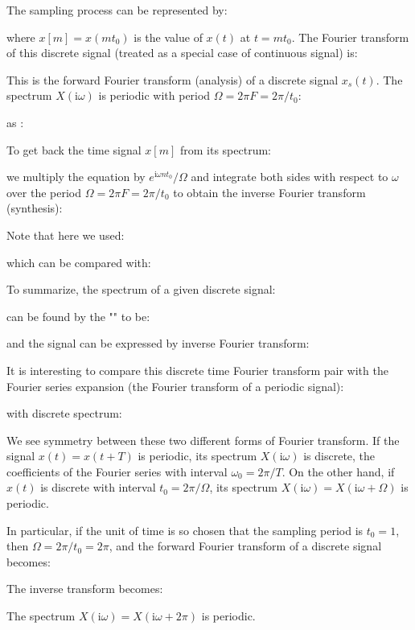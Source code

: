 	The sampling process can be represented by:
	
	where $x[m]=x(mt_0)$ is the value of $x(t)$ at $t=mt_0$. The Fourier transform of this discrete signal (treated as a special case of continuous signal) is:
	
	This is the forward Fourier transform (analysis) of a discrete signal $x_s(t)$. The spectrum $X(\mathrm{i}\omega)$ is periodic with period $\Omega=2\pi F=2\pi/t_0$:
	
	as :
	
	
	To get back the time signal $x[m]$ from its spectrum:
	
	we multiply the equation by $e^{\mathrm{i}\omega nt_0}/\Omega$ and integrate both sides with respect to $\omega$ over the period $\Omega=2\pi F=2\pi/t_0$	to obtain the inverse Fourier transform (synthesis):
	
	Note that here we used:
	
	which can be compared with:
	
	To summarize, the spectrum of a given discrete signal:
	
	can be found by the "" to be:
	
	and the signal can be expressed by inverse Fourier transform:
	
	It is interesting to compare this discrete time Fourier transform pair with the Fourier series expansion (the Fourier transform of a periodic signal): 
	
	
	with discrete spectrum:
	
	We see symmetry between these two different forms of Fourier transform. If the signal $x(t)=x(t+T)$ is periodic, its spectrum $X(\mathrm{i}\omega)$ is discrete, the coefficients of the Fourier series with interval $\omega_0=2\pi/T$. On the other hand, if $x(t)$ is discrete with interval $t_0=2\pi/\Omega$, its spectrum $X(\mathrm{i}\omega)=X(\mathrm{i}\omega+\Omega)$ is periodic.
	
	In particular, if the unit of time is so chosen that the sampling period is $t_0=1$, then $\Omega=2\pi/t_0=2\pi$, and the forward Fourier transform of a discrete signal becomes:
	
	The inverse transform becomes:
	
	The spectrum $X(\mathrm{i}\omega)=X(\mathrm{i}\omega+2\pi)$ is periodic.
	
